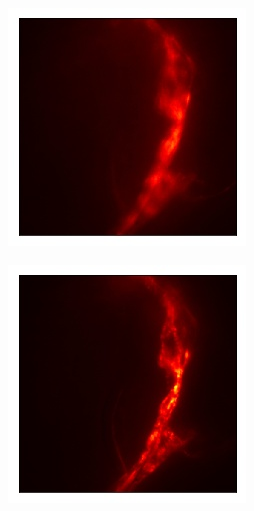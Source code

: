 \begin{figure}[h]
	\begin{subfigure}{0.48\textwidth}
		\centering
		\includegraphics[width=\linewidth]{images/sensorless_successful_start.jpg}
		\caption{}
		\label{fig:sensorless_successful_start}
	\end{subfigure}
	\begin{subfigure}{0.48\textwidth}
		\centering
		\includegraphics[width=\linewidth]{images/sensorless_successful_end.jpg}

\end{subfigure}
\end{figure}
